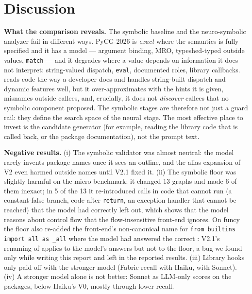 \section{Discussion}
\label{sec:discussion}

\textbf{What the comparison reveals.} The symbolic baseline and the
neuro-symbolic analyzer fail in different ways. PyCG-2026 is \emph{exact}
where the semantics is fully specified and it has a model --- argument binding,
MRO, typeshed-typed outside values, \texttt{match} --- and it degrades where a
value depends on information it does not interpret: string-valued dispatch,
\texttt{eval}, documented roles, library callbacks. \nscg reads code the way a
developer does and handles string-built dispatch and dynamic features well, but
it over-approximates with the hints it is given, misnames outside callees, and,
crucially, it does not \emph{discover} callees that no symbolic component
proposed. The symbolic stages are therefore not just a guard rail: they define
the search space of the neural stage. The most effective place to invest is the
candidate generator (for example, reading the library code that is called back,
or the package documentation), not the prompt text.

\textbf{Negative results.} (i) The symbolic validator was almost neutral: the
model rarely invents package names once it sees an outline, and the alias
expansion of V2 even harmed outside names until V2.1 fixed it. (ii) The
symbolic floor was slightly harmful on the micro-benchmark: it changed 13
graphs and made 6 of them inexact; in 5 of the 13 it re-introduced calls in
code that cannot run (a constant-false branch, code after \texttt{return}, an
exception handler that cannot be reached) that the model had correctly left
out, which shows that the model reasons about control flow that the
flow-insensitive front-end ignores. On funcy the floor also re-added the
front-end's non-canonical name  for \texttt{from builtins
import all as \_all} where the model had answered the correct
: V2.1's renaming of  applies to the model's
answers but not to the floor, a bug we found only while writing this report and
left in the reported results. (iii) Library hooks only paid off with
the stronger model (Fabric recall  with Haiku,
 with Sonnet). (iv) A stronger model alone is not
better: Sonnet as LLM-only scores  on the
packages, below Haiku's V0, mostly through lower recall.

